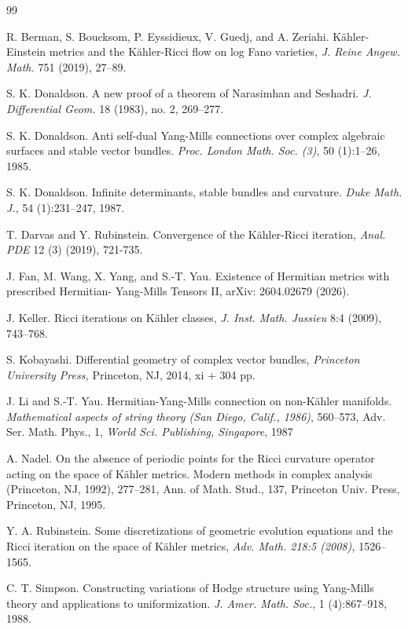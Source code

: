 \documentclass[11pt]{amsart}
\numberwithin{equation}{section}
\theoremstyle{remark}
\begin{document}
\begin{thebibliography}{99}



 R. Berman, S. Boucksom, P. Eyssidieux, V. Guedj, and A. Zeriahi. K\"ahler-Einstein metrics and the K\"ahler-Ricci flow on log Fano varieties, {\it J. Reine Angew. Math.} 751 (2019), 27–89.


S. K. Donaldson. A new proof of a theorem of Narasimhan and Seshadri. {\it J. Differential Geom.} 18 (1983), no. 2, 269–277.

S. K. Donaldson. Anti self-dual Yang-Mills connections over complex algebraic surfaces and stable vector bundles. {\it Proc. London Math. Soc. (3)}, 50 (1):1--26, 1985.



S. K. Donaldson. Infinite determinants, stable bundles and curvature. {\it Duke Math. J.}, 54 (1):231--247, 1987.

T. Darvas and Y. Rubinstein. Convergence of the K\"ahler-Ricci iteration, {\it Anal. PDE} 12 (3) (2019), 721-735.

J. Fan, M. Wang, X. Yang, and S.-T. Yau. Existence of Hermitian metrics with prescribed Hermitian- Yang-Mills Tensors II, arXiv: 2604.02679 (2026).


J. Keller. Ricci iterations on K\"ahler classes, {\it J. Inst. Math. Jussieu} 8:4 (2009), 743--768.

S. Kobayashi. Differential geometry of complex vector bundles, {\it Princeton University Press,} Princeton, NJ, 2014, xi + 304 pp.

 J. Li and S.-T. Yau. Hermitian-Yang-Mills connection on non-K\"ahler manifolds. {\it Mathematical aspects of string theory (San Diego, Calif., 1986)}, 560--573, Adv. Ser. Math. Phys., 1, {\it World Sci. Publishing, Singapore}, 1987


A. Nadel. On the absence of periodic points for the Ricci curvature operator acting on the space of K\"ahler metrics. Modern methods in complex analysis (Princeton, NJ, 1992), 277–281,
Ann. of Math. Stud., 137, Princeton Univ. Press, Princeton, NJ, 1995.


Y. A. Rubinstein. Some discretizations of geometric evolution equations and the Ricci iteration on the space
of K\"ahler metrics, {\it Adv. Math. 218:5 (2008),} 1526–1565.

C. T. Simpson. Constructing variations of Hodge structure using Yang-Mills theory and applications to uniformization. {\it J. Amer. Math. Soc.}, 1 (4):867--918, 1988.



\end{thebibliography}
\end{document}
